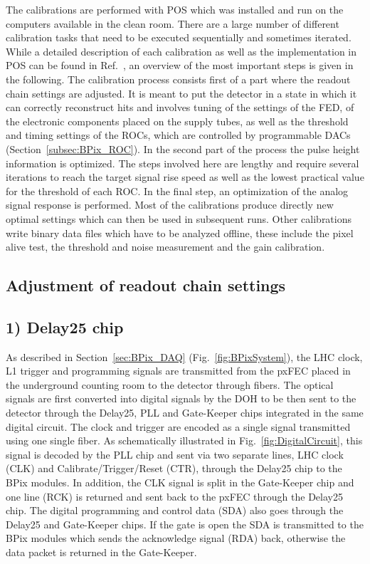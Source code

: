 The calibrations are performed with POS which was installed and run on the computers available in the clean room.
There are a large number of different calibration tasks that need to be executed sequentially and sometimes iterated.
While a detailed description of each calibration as well as the implementation in POS can be found in Ref.~\cite{POSCalib}, an overview of the most important steps is given in the following.
The calibration process consists first of a part where the readout chain settings are adjusted. It is meant to put the detector in a state in which it can correctly reconstruct hits and involves tuning of the settings of the FED,
of the electronic components placed on the supply tubes, as well as the threshold and timing settings of the ROCs, which are controlled by programmable DACs (Section~\ref{subsec:BPix_ROC}).
In the second part of the process the pulse height information is optimized. The steps involved here are lengthy and require several iterations to reach the target signal rise speed as well as the lowest practical value for the threshold of each ROC. In the final step, an optimization of the analog signal response is performed.
Most of the calibrations produce directly new optimal settings which can then be used in subsequent runs.
Other calibrations write binary data files which have to be analyzed offline, these include the pixel alive test, the threshold and noise measurement and the gain calibration.

\subsection{Adjustment of readout chain settings}\label{subsec:calibPart1}

\subsection*{1) Delay25 chip}

As described in Section~\ref{sec:BPix_DAQ} (Fig.~\ref{fig:BPixSystem}), the LHC clock, L1 trigger and programming signals are transmitted from the pxFEC placed in the underground counting room to the detector through fibers.
The optical signals are first converted into digital signals by the DOH to be then sent to the detector through the Delay25, PLL and Gate-Keeper chips integrated in the same digital circuit.
The clock and trigger are encoded as a single signal transmitted using one single fiber.
As schematically illustrated in Fig.~\ref{fig:DigitalCircuit}, this signal is decoded by the PLL chip and sent via two separate lines, LHC clock (CLK) and Calibrate/Trigger/Reset (CTR), through the Delay25 chip to the BPix modules.
In addition, the CLK signal is split in the Gate-Keeper chip and one line (RCK) is returned and sent back to the pxFEC through the Delay25 chip.
The digital programming and control data (SDA) also goes through the Delay25 and Gate-Keeper chips.
If the gate is open the SDA is transmitted to the BPix modules which sends the acknowledge signal (RDA) back, otherwise the data packet is returned in the Gate-Keeper.

